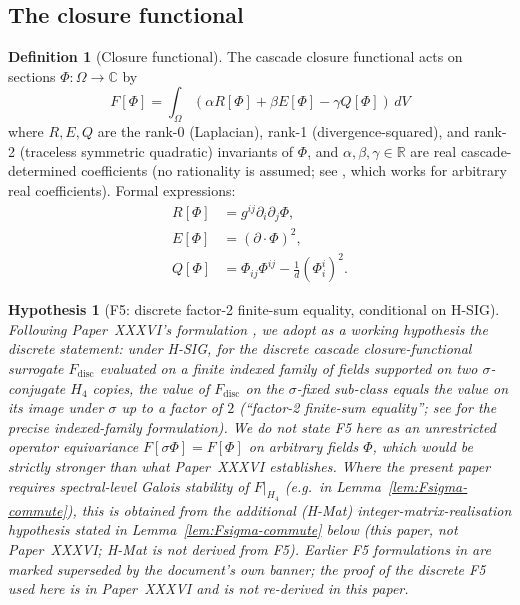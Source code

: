 \documentclass[11pt, a4paper]{amsart}
\newtheorem{hypothesis}[theorem]{Hypothesis}
\theoremstyle{definition}
\newtheorem{definition}[theorem]{Definition}
\newcommand{\R}{\mathbb{R}}
\newcommand{\C}{\mathbb{C}}
\begin{document}
\subsection{The closure functional}

\begin{definition}[Closure functional]\label{def:F}
The cascade closure functional acts on sections $\Phi: \Omega \to \C$
by
\[
F[\Phi] = \int_\Omega (\alpha R[\Phi] + \beta E[\Phi] - \gamma Q[\Phi]) \, dV
\]
where $R, E, Q$ are the rank-0 (Laplacian), rank-1 (divergence-squared),
and rank-2 (traceless symmetric quadratic) invariants of $\Phi$, and
$\alpha, \beta, \gamma \in \R$ are real cascade-determined
coefficients (no rationality is assumed; see
\cite[F5 statement]{PaperXXXVI}, which works for arbitrary real
coefficients). Formal expressions:
\begin{align*}
R[\Phi] &= g^{ij}\partial_i\partial_j\Phi, \\
E[\Phi] &= (\partial \cdot \Phi)^2, \\
Q[\Phi] &= \Phi_{ij}\Phi^{ij} - \tfrac{1}{d}(\Phi^i_i)^2.
\end{align*}
\end{definition}

\begin{hypothesis}[F5: discrete factor-2 finite-sum equality, conditional on H-SIG]\label{hyp:F5}
Following Paper~XXXVI's formulation
\cite[Theorem F5 under H-SIG]{PaperXXXVI}, we adopt as a working
hypothesis the \emph{discrete} statement: under H-SIG, for the
discrete cascade closure-functional surrogate $F_{\mathrm{disc}}$
evaluated on a finite indexed family of fields supported on two
$\sigma$-conjugate $H_4$ copies, the value of
$F_{\mathrm{disc}}$ on the $\sigma$-fixed sub-class equals the
value on its image under $\sigma$ up to a factor of $2$
(``factor-2 finite-sum equality''; see
\cite[lines 539--562]{PaperXXXVI} for the precise indexed-family
formulation).  We do \emph{not} state F5 here as an unrestricted
operator equivariance $F[\sigma\Phi] = F[\Phi]$ on arbitrary
fields $\Phi$, which would be strictly stronger than what
Paper~XXXVI establishes.  Where the present paper requires
spectral-level Galois stability of $F|_{H_4}$ (e.g.\ in
Lemma~\ref{lem:Fsigma-commute}), this is obtained from the
additional (H-Mat) integer-matrix-realisation hypothesis stated
in Lemma~\ref{lem:Fsigma-commute} below (this paper, not
Paper~XXXVI; H-Mat is not derived from F5).  Earlier F5 formulations in
\cite{CascadeFoundations} are marked superseded by the document's
own banner; the proof of the discrete F5 used here is in
Paper~XXXVI and is not re-derived in this paper.
\end{hypothesis}
\end{document}
